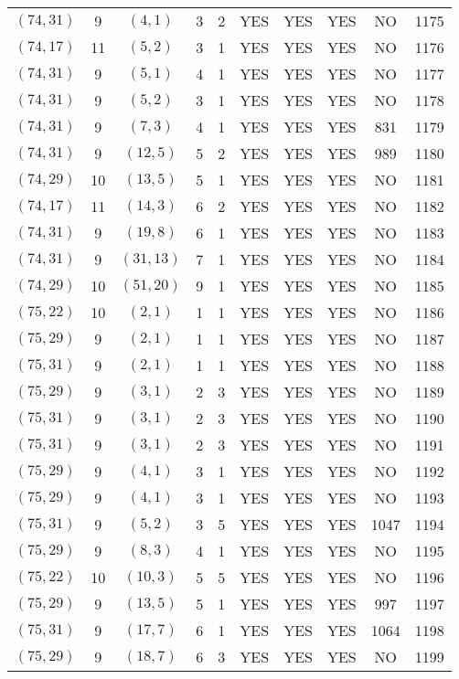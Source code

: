 \begin{longtable}{|c|c|c|c|c|c|c|c|c|c|}
$(74, 31)$ & 9 & $(4, 1)$ & 3 & 2 & YES & YES & YES & NO & 1175\\
$(74, 17)$ & 11 & $(5, 2)$ & 3 & 1 & YES & YES & YES & NO & 1176\\
$(74, 31)$ & 9 & $(5, 1)$ & 4 & 1 & YES & YES & YES & NO & 1177\\
$(74, 31)$ & 9 & $(5, 2)$ & 3 & 1 & YES & YES & YES & NO & 1178\\
$(74, 31)$ & 9 & $(7, 3)$ & 4 & 1 & YES & YES & YES & 831 & 1179\\
$(74, 31)$ & 9 & $(12, 5)$ & 5 & 2 & YES & YES & YES & 989 & 1180\\
$(74, 29)$ & 10 & $(13, 5)$ & 5 & 1 & YES & YES & YES & NO & 1181\\
$(74, 17)$ & 11 & $(14, 3)$ & 6 & 2 & YES & YES & YES & NO & 1182\\
$(74, 31)$ & 9 & $(19, 8)$ & 6 & 1 & YES & YES & YES & NO & 1183\\
$(74, 31)$ & 9 & $(31, 13)$ & 7 & 1 & YES & YES & YES & NO & 1184\\
$(74, 29)$ & 10 & $(51, 20)$ & 9 & 1 & YES & YES & YES & NO & 1185\\
$(75, 22)$ & 10 & $(2, 1)$ & 1 & 1 & YES & YES & YES & NO & 1186\\
$(75, 29)$ & 9 & $(2, 1)$ & 1 & 1 & YES & YES & YES & NO & 1187\\
$(75, 31)$ & 9 & $(2, 1)$ & 1 & 1 & YES & YES & YES & NO & 1188\\
$(75, 29)$ & 9 & $(3, 1)$ & 2 & 3 & YES & YES & YES & NO & 1189\\
$(75, 31)$ & 9 & $(3, 1)$ & 2 & 3 & YES & YES & YES & NO & 1190\\
$(75, 31)$ & 9 & $(3, 1)$ & 2 & 3 & YES & YES & YES & NO & 1191\\
$(75, 29)$ & 9 & $(4, 1)$ & 3 & 1 & YES & YES & YES & NO & 1192\\
$(75, 29)$ & 9 & $(4, 1)$ & 3 & 1 & YES & YES & YES & NO & 1193\\
$(75, 31)$ & 9 & $(5, 2)$ & 3 & 5 & YES & YES & YES & 1047 & 1194\\
$(75, 29)$ & 9 & $(8, 3)$ & 4 & 1 & YES & YES & YES & NO & 1195\\
$(75, 22)$ & 10 & $(10, 3)$ & 5 & 5 & YES & YES & YES & NO & 1196\\
$(75, 29)$ & 9 & $(13, 5)$ & 5 & 1 & YES & YES & YES & 997 & 1197\\
$(75, 31)$ & 9 & $(17, 7)$ & 6 & 1 & YES & YES & YES & 1064 & 1198\\
$(75, 29)$ & 9 & $(18, 7)$ & 6 & 3 & YES & YES & YES & NO & 1199\\

\end{longtable}
